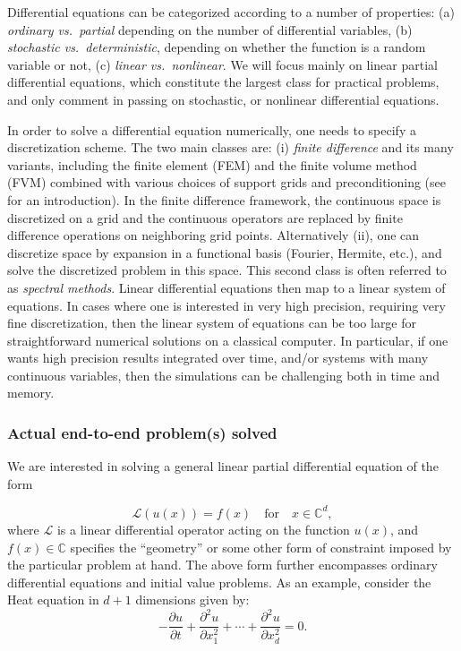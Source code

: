 \begin{refsection}
Differential equations can be categorized according to a number of properties: (a) \textit{ordinary vs.~partial} depending on the number of differential variables, (b) \textit{stochastic vs.~deterministic}, depending on whether the function is a random variable or not, (c) \textit{linear vs.~nonlinear}. We will focus mainly on linear partial differential equations, which constitute the largest class for practical problems, and only comment in passing on  stochastic, or nonlinear differential equations. 

In order to solve a differential equation numerically, one needs to specify a discretization scheme. The two main classes are: (i) \textit{finite difference} and its many variants, including the finite element (FEM) and the finite volume method (FVM) combined with various choices of support grids and preconditioning (see \cite{larson2013finite,trottenberg2000multigrid} for an introduction). In the finite difference framework, the continuous space is discretized on a grid  and the continuous operators are replaced by finite difference operations on neighboring grid points.   Alternatively (ii), one can discretize space by expansion in a functional basis (Fourier, Hermite, etc.), and solve the discretized problem in this space. This second class is often referred to as \textit{spectral methods}. Linear differential equations then map to a linear system of equations. In cases where one is interested in very high precision, requiring very fine discretization, then the linear system of equations can be too large for straightforward numerical solutions on a classical computer. In particular, if one wants high precision results integrated over time, and/or systems with many continuous variables, then the simulations can be challenging both in time and memory. 

\subsubsection*{Actual end-to-end problem(s) solved}

We are interested in solving a general linear partial differential equation of the form 

\begin{equation}\label{eqn:lindiffeq}
    \mathcal{L}(u(x))=f(x)\quad \text{for}\quad x\in \mathbb{C}^d,
\end{equation}
where $\mathcal{L}$ is a linear differential operator acting on the function $u(x)$, and $f(x) \in \mathbb{C}$ specifies the ``geometry'' or some other form of constraint imposed by the particular problem at hand.  
The above form further encompasses ordinary differential equations and initial value problems. As an example, consider the Heat equation in $d+1$ dimensions given by: 
\begin{equation}
    -\frac{\partial u}{\partial t}+\frac{\partial^2 u}{\partial x^2_1}+\cdots + \frac{\partial^2 u}{\partial x^2_d}=0.
\end{equation} 



\end{refsection}

